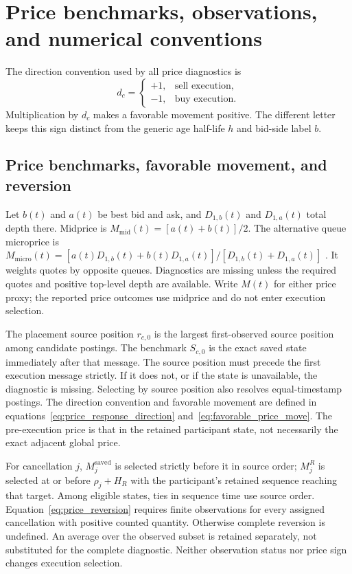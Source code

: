 \section{Price benchmarks, observations, and numerical conventions}
\label{sec:price_technical}
The direction convention used by all price diagnostics is
\begin{equation}
    d_c=\begin{cases}+1,&\text{sell execution},\\-1,&\text{buy execution}.\end{cases}
    \label{eq:price_response_direction}
\end{equation}
Multiplication by $d_c$ makes a favorable movement positive. The different letter keeps this sign distinct from the generic age half-life $h$ and bid-side label $b$.

\subsection{Price benchmarks, favorable movement, and reversion}
\label{subsec:price_response_diagnostics}
Let $b(t)$ and $a(t)$ be best bid and ask, and $D_{1,b}(t)$ and $D_{1,a}(t)$ total depth there. Midprice is $M_{\mathrm{mid}}(t)=[a(t)+b(t)]/2$. The alternative queue microprice is $M_{\mathrm{micro}}(t)=[a(t)D_{1,b}(t)+b(t)D_{1,a}(t)]/[D_{1,b}(t)+D_{1,a}(t)]$ \cite{Stoikov02122018}. It weights quotes by opposite queues. Diagnostics are missing unless the required quotes and positive top-level depth are available. Write $M(t)$ for either price proxy; the reported price outcomes use midprice and do not enter execution selection.

The placement source position $r_{c,0}$ is the largest first-observed source position among candidate postings. The benchmark $S_{c,0}$ is the exact saved state immediately after that message. The source position must precede the first execution message strictly. If it does not, or if the state is unavailable, the diagnostic is missing. Selecting by source position also resolves equal-timestamp postings. The direction convention and favorable movement are defined in equations~\eqref{eq:price_response_direction} and~\eqref{eq:favorable_price_move}. The pre-execution price is that in the retained participant state, not necessarily the exact adjacent global price.

For cancellation $j$, $M_j^{\mathrm{saved}}$ is selected strictly before it in source order; $M_j^{R}$ is selected at or before $\rho_j+H_R$ with the participant's retained sequence reaching that target. Among eligible states, ties in sequence time use source order. Equation~\eqref{eq:price_reversion} requires finite observations for every assigned cancellation with positive counted quantity. Otherwise complete reversion is undefined. An average over the observed subset is retained separately, not substituted for the complete diagnostic. Neither observation status nor price sign changes execution selection.

